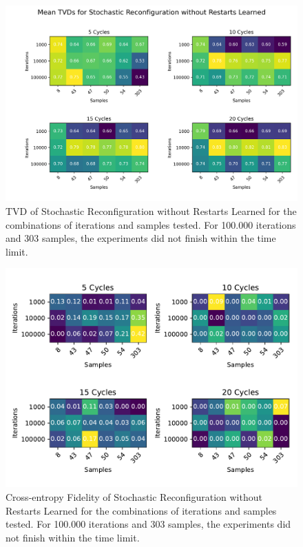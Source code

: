 \begin{figure}[H]
  \centering
  \includegraphics[width=\textwidth]{figures/results/SR-no-restarts-learned/tvd_heatmap.png}
  \caption[TVD of Stochastic Reconfiguration without Restarts Learned]{TVD of Stochastic 
  Reconfiguration without Restarts Learned for the combinations of iterations and samples tested.
  For 100.000 iterations and 303 samples, the experiments did not finish within the time limit.}
  \label{fig:sr_tvd}
\end{figure}

\begin{figure}[H]
  \centering
  \includegraphics[width=\textwidth]{figures/results/SR-no-restarts-learned/fxeb_heatmap.pdf}
  \caption[Cross-entropy Fidelity of Stochastic Reconfiguration without Restarts Learned]{Cross-entropy Fidelity of Stochastic 
  Reconfiguration without Restarts Learned for the combinations of iterations and samples tested.
  For 100.000 iterations and 303 samples, the experiments did not finish within the time limit.}
  \label{fig:sr_tvd}
\end{figure}


